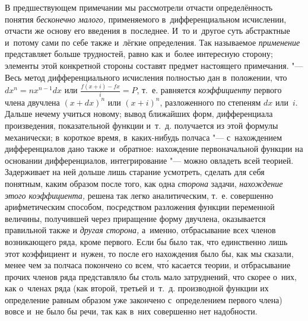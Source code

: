 В предшествующем примечании мы рассмотрели отчасти определённость понятия
{\em бесконечно малого,} применяемого в~дифференциальном исчислении, отчасти же
основу его введения в~последнее. И~то и~другое суть абстрактные и~потому сами
по себе также и~лёгкие определения. Так называемое {\em применение}
представляет больше трудностей, равно как и~более интересную сторону; элементы
этой конкретной стороны составят предмет настоящего примечания. "--- Весь метод
дифференциального исчисления полностью дан в~положении, что $dx^n=nx^{n-1}dx$
или $\frac{f\left(x+i\right)-fx}i=P$, т.~е. равняется {\em коэффициенту}
первого члена двучлена $(x+dx)^n$ или $(x+i)^n$, разложенного по степеням $dx$ или~$i$. Дальше нечему учиться
новому; вывод ближайших форм, дифференциала произведения, показательной функции
и~т.~д. получается из этой формулы механически; в~короткое время,
в~каких-нибудь полчаса "--- с~нахождением дифференциалов дано также и~обратное:
нахождение первоначальной функции на основании дифференциалов, интегрирование
"--- можно овладеть всей теорией. Задерживает на ней дольше лишь старание
усмотреть, сделать для себя понятным, каким образом после того, как одна
{\em сторона} задачи, {\em нахождение этого коэффициента,} решена так легко
аналитическим, т.~е. совершенно арифметическим способом, посредством разложения
функции переменной величины, получившей через приращение форму двучлена,
оказывается правильной также и {\em другая сторона,} а~именно, отбрасывание
всех членов возникающего ряда, кроме первого. Если бы было так, что
единственно лишь этот коэффициент и~нужен, то после его нахождения было бы,
как мы сказали, менее чем за полчаса покончено со всем, чт\'{о} касается теории,
и отбрасывание прочих членов ряда представляло бы столь мало затруднений, что
скорее о~них, как о~членах ряда (как второй, третьей и~т.~д.
производной функции их определение равным образом уже закончено с~определением
первого члена) вовсе и~не было бы речи, так как в~них совершенно нет надобности.

